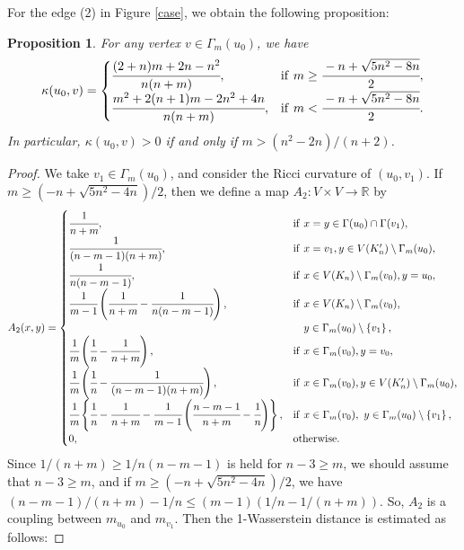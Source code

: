 \documentclass[leqno,12pt]{amsart} %
\theoremstyle{plain} %
\newtheorem{proposition}[theorem]{\indent\sc Proposition}
\theoremstyle{definition} %
\begin{document}
For the edge (2) in Figure \ref{case}, we obtain the following proposition:
\begin{proposition}
\label{２番目}
For any vertex $v \in \Gamma_m (u_0)$, we have
\begin{eqnarray*}
\kappa(u_0, v) = 
\begin{cases}
\cfrac{(2+n)m + 2n - n^2}{n(n+m)}, & \mathrm{if}\ m \geq \cfrac{-n + \sqrt{5n^2 -8n}}{2},\\
\cfrac{m^2 + 2(n+1)m - 2n^2 +4n}{n(n+m)}, & \mathrm{if}\ m < \cfrac{-n + \sqrt{5n^2 -8n}}{2}.
\end{cases}
\end{eqnarray*}
In particular, $\kappa(u_0,v) > 0$ if and only if $m > (n^2 -2n)/(n+2)$.
\end{proposition}
\begin{proof}
We take $v_{1} \in \Gamma_m (u_0)$, and consider the Ricci curvature of $(u_0, v_{1})$. If $m \geq (-n + \sqrt{5n^2 -4n})/2$, then we define a map $A_2: V \times V \to \mathbb{R}$ by
\begin{eqnarray*}
A_2 (x, y)
=
\begin{cases}
\cfrac{1}{n+m}, & \mathrm{if}\ x=y \in \Gamma(u_0) \cap \Gamma(v_{1}),\\
\cfrac{1}{(n-m-1)(n+m)}, & \mathrm{if}\ x=v_{1}, y \in V(K'_n) \setminus \Gamma_m (u_0),\\
\cfrac{1}{n(n-m-1)}, & \mathrm{if}\ x \in V(K_n) \setminus \Gamma_m (v_0), y = u_0,\\
\cfrac{1}{m-1} \left( \cfrac{1}{n+m} -\cfrac{1}{n(n-m-1)} \right), & \mathrm{if}\ x \in V(K_n) \setminus \Gamma_m (v_0),\\ &\ \ \  y \in  \Gamma_m (u_0) \setminus \left\{ v_1 \right\},\\
\cfrac{1}{m} \left( \cfrac{1}{n} - \cfrac{1}{n+m} \right), & \mathrm{if}\ x \in \Gamma_m (v_0), y= v_0,\\
\cfrac{1}{m}\left(\cfrac{1}{n}- \cfrac{1}{(n-m-1)(n+m)} \right), & \mathrm{if}\ x \in \Gamma_m (v_0), y \in V(K'_n) \setminus \Gamma_m (u_0),\\
\cfrac{1}{m} \left\{ \cfrac{1}{n} - \cfrac{1}{n+m} - \cfrac{1}{m-1} \left( \cfrac{n-m-1}{n+m} - \cfrac{1}{n} \right) \right\}, & \mathrm{if}\ x \in \Gamma_m (v_0),\ y \in \Gamma_m (u_0) \setminus \left\{ v_1 \right\},\\
0, & \mathrm{otherwise}.
\end{cases}
\end{eqnarray*}
Since $1/(n+m) \geq 1/n(n-m-1)$ is held for $n-3 \geq m$, we should assume that $n-3 \geq m$, and if $m \geq (-n + \sqrt{5n^2 -4n})/2$, we have $(n-m-1)/(n+m) - 1/n \leq (m-1)(1/n - 1/(n+m))$. So, $A_2$ is a coupling between $m_{u_0}$ and $m_{v_1}$. Then the 1-Wasserstein distance is estimated as follows:

\end{proof}
\end{document}
